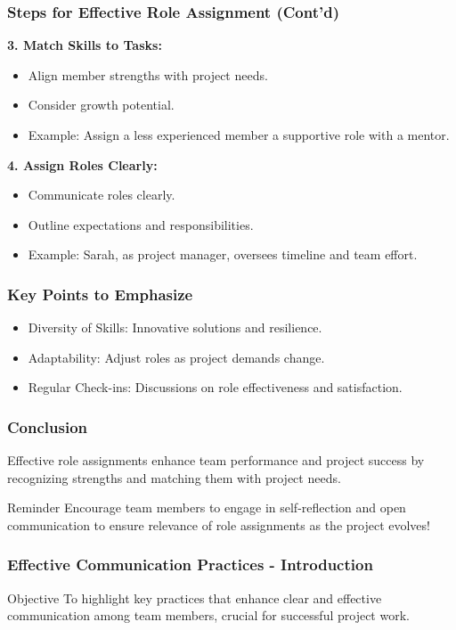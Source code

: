 \documentclass[aspectratio=169]{beamer}
\begin{document}
\begin{frame}[fragile]
    \frametitle{Steps for Effective Role Assignment (Cont'd)}
    \textbf{3. Match Skills to Tasks:}
    \begin{itemize}
        \item Align member strengths with project needs.
        \item Consider growth potential.
        \item Example: Assign a less experienced member a supportive role with a mentor.
    \end{itemize}

    \textbf{4. Assign Roles Clearly:}
    \begin{itemize}
        \item Communicate roles clearly.
        \item Outline expectations and responsibilities.
        \item Example: Sarah, as project manager, oversees timeline and team effort.
    \end{itemize}
\end{frame}

\begin{frame}[fragile]
    \frametitle{Key Points to Emphasize}
    \begin{itemize}
        \item Diversity of Skills: Innovative solutions and resilience.
        \item Adaptability: Adjust roles as project demands change.
        \item Regular Check-ins: Discussions on role effectiveness and satisfaction.
    \end{itemize}
\end{frame}

\begin{frame}[fragile]
    \frametitle{Conclusion}
    Effective role assignments enhance team performance and project success by recognizing strengths and matching them with project needs.

    \begin{block}{Reminder}
        Encourage team members to engage in self-reflection and open communication to ensure relevance of role assignments as the project evolves!
    \end{block}
\end{frame}

\begin{frame}[fragile]
    \frametitle{Effective Communication Practices - Introduction}
    \begin{block}{Objective}
        To highlight key practices that enhance clear and effective communication among team members, crucial for successful project work.
    \end{block}
\end{frame}
\end{document}
